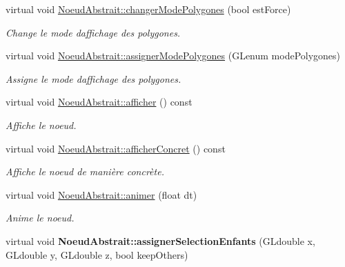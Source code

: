 \begin{DoxyCompactItemize}
virtual void \hyperlink{group__inf2990_ga13a97383c2081b405fc2e0d97cff80df}{Noeud\+Abstrait\+::changer\+Mode\+Polygones} (bool est\+Force)
\begin{DoxyCompactList}\small\item\em Change le mode d\textquotesingle{}affichage des polygones. \end{DoxyCompactList}\item 
virtual void \hyperlink{group__inf2990_ga726d9d0a524939f405aeeac3fbd06666}{Noeud\+Abstrait\+::assigner\+Mode\+Polygones} (G\+Lenum mode\+Polygones)
\begin{DoxyCompactList}\small\item\em Assigne le mode d\textquotesingle{}affichage des polygones. \end{DoxyCompactList}\item 
virtual void \hyperlink{group__inf2990_gae789271ea41032d717b8e4300be05de0}{Noeud\+Abstrait\+::afficher} () const 
\begin{DoxyCompactList}\small\item\em Affiche le noeud. \end{DoxyCompactList}\item 
virtual void \hyperlink{group__inf2990_ga330df455c8b08440d3c8e64d0a480391}{Noeud\+Abstrait\+::afficher\+Concret} () const 
\begin{DoxyCompactList}\small\item\em Affiche le noeud de manière concrète. \end{DoxyCompactList}\item 
virtual void \hyperlink{group__inf2990_gadc6ebe69894dbb682fdd0ecb1b6c11e9}{Noeud\+Abstrait\+::animer} (float dt)
\begin{DoxyCompactList}\small\item\em Anime le noeud. \end{DoxyCompactList}\item 
\hypertarget{group__inf2990_ga78bba41d63a1a2a621e82c8247180b42}{}virtual void {\bfseries Noeud\+Abstrait\+::assigner\+Selection\+Enfants} (G\+Ldouble x, G\+Ldouble y, G\+Ldouble z, bool keep\+Others)\label{group__inf2990_ga78bba41d63a1a2a621e82c8247180b42}


\end{DoxyCompactItemize}
